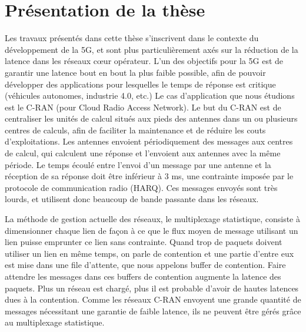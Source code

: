 
\chapter*{Présentation de la thèse}
\label{chap:introfr}


Les travaux présentés dans cette thèse s'inscrivent dans le contexte du développement de la 5G, et sont plus particulièrement axés sur la réduction de la latence dans les réseaux cœur opérateur.
L'un des objectifs pour la 5G est de garantir une latence bout en bout la plus faible possible, afin de pouvoir développer des applications pour lesquelles le temps de réponse est critique (véhicules autonomes, industrie 4.0, etc.)
Le cas d'application que nous étudions est le C-RAN (pour Cloud Radio Access Network). Le but du C-RAN est de centraliser les unités de calcul situés aux pieds des antennes dans un ou plusieurs centres de calculs, afin de faciliter la maintenance et de réduire les couts d'exploitations. Les antennes envoient périodiquement des messages aux centres de calcul, qui calculent une réponse et l'envoient aux antennes avec la même période. Le temps écoulé entre l'envoi d'un message par une antenne et la réception de sa réponse doit être inférieur à $3$ ms, une contrainte imposée par le protocole de communication radio (HARQ). Ces messages envoyés sont très lourds, et utilisent donc beaucoup de bande passante dans les réseaux.

La méthode de gestion actuelle des réseaux, le multiplexage statistique, consiste à dimensionner chaque lien de façon à ce que le flux moyen de message utilisant un lien puisse emprunter ce lien sans contrainte. Quand trop de paquets doivent utiliser un lien en même temps, on parle de contention et une partie d'entre eux est mise dans une file d'attente, que nous appelons buffer de contention. Faire attendre les messages dans ces buffers de contention augmente la latence des paquets. Plus un réseau est chargé, plus il est probable d'avoir de hautes latences dues à la contention. Comme les réseaux C-RAN envoyent une grande quantité de messages nécessitant une garantie de faible latence, ils ne peuvent être gérés grâce au multiplexage statistique.


